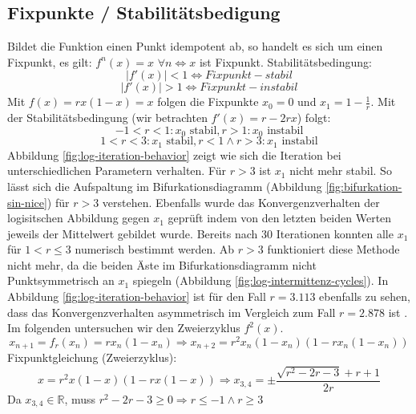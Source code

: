 \documentclass{scrartcl}
\begin{document}
\subsection{Fixpunkte / Stabilitätsbedigung}
Bildet die Funktion einen Punkt idempotent ab, so handelt es sich um einen Fixpunkt, es gilt: $f^n(x)=x$ $\forall n \iff x$ ist Fixpunkt. 
Stabilitätsbedingung:
\begin{equation} |f'(x)|<1 \iff Fixpunkt-stabil \end{equation}
\begin{equation} |f'(x)|>1 \iff Fixpunkt-instabil \end{equation}
Mit $ f(x)=rx(1-x)=x $ folgen die Fixpunkte $x_{0}=0$ und $x_{1}=1-\frac{1}{r}$. Mit der Stabilitätsbedingung (wir betrachten $f'(x)=r-2rx$) folgt:
\begin{equation}
-1 < r < 1: x_{0} \text{ stabil}, r > 1: x_{0} \text{ instabil}
\end{equation}
\begin{equation}
1 < r < 3: x_1 \text{ stabil}, r<1 \wedge  r> 3: x_1 \text{ instabil}
\end{equation}
Abbildung \ref{fig:log-iteration-behavior} zeigt wie sich die Iteration bei unterschiedlichen Parametern verhalten. Für $r>3$ ist $x_1$ nicht mehr stabil. So lässt sich die Aufspaltung im Bifurkationsdiagramm (Abbildung \ref{fig:bifurkation-sin-nice}) für $r>3$ verstehen. Ebenfalls wurde das Konvergenzverhalten der logisitschen Abbildung gegen $x_1$ geprüft indem von den letzten beiden Werten jeweils der Mittelwert gebildet wurde. Bereits nach 30 Iterationen konnten alle $x_1$ für $1 < r \leq 3$ numerisch bestimmt werden. Ab $r>3$ funktioniert diese Methode nicht mehr, da die beiden Äste im Bifurkationsdiagramm nicht Punktsymmetrisch an $x_1$ spiegeln (Abbildung \ref{fig:log-intermittenz-cycles}). In Abbildung \ref{fig:log-iteration-behavior} ist für den Fall $r=3.113$ ebenfalls zu sehen, dass das Konvergenzverhalten asymmetrisch im Vergleich zum Fall $r=2.878$ ist .
Im folgenden untersuchen wir den Zweierzyklus $f^2(x)$.
\begin{equation}x_{n+1}=f_r(x_n)=rx_n(1-x_n)
\Rightarrow x_{n+2}=r^2x_n(1-x_n)(1-rx_n(1-x_n))\end{equation}
\newline
Fixpunktgleichung (Zweierzyklus):
\begin{equation}
x=r^2x(1-x)(1-rx(1-x))
\Rightarrow 
x_{3,4}=\pm\frac{\sqrt{r^2-2 r-3}+r+1}{2 r}
\end{equation}
Da $x_{3,4} \in \mathbb{R} $, muss $r^2-2 r-3 \geq 0 \Rightarrow r \leq -1 \land r \geq 3$
\end{document}
